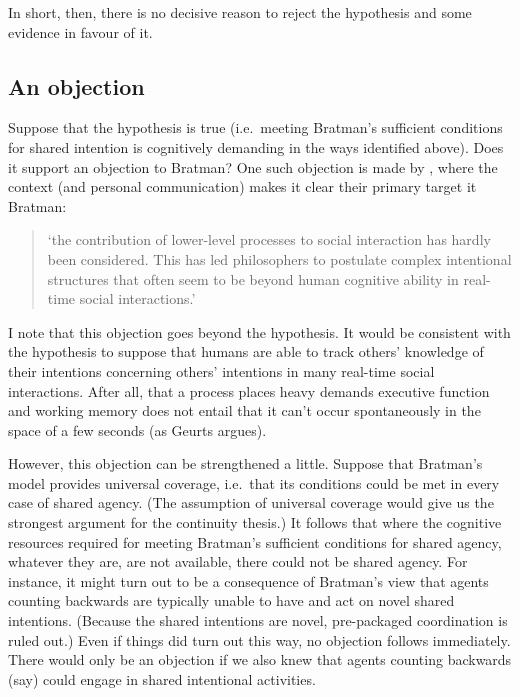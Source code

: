 \documentclass[12pt,letterpaper]{extarticle}
\begin{document}
In short, then, there is no decisive reason to reject the hypothesis and  some evidence in favour of it.


\subsection{An objection}
Suppose that the hypothesis is true (i.e.\ meeting Bratman's sufficient conditions for shared intention is cognitively demanding in the ways identified above).
Does it support an objection to Bratman?
One such objection is made by \citet[p.\ 2022]{Knoblich:2008hy}, where the context (and personal communication) makes it clear their primary target it Bratman: 
%
\begin{quote}
`the contribution of lower-level processes to social interaction has hardly been considered. This has led philosophers to postulate complex intentional structures that often seem to be beyond human cognitive ability in real-time social interactions.'
\end{quote} 
%
I note that this objection goes beyond the hypothesis.
It would be consistent with the hypothesis to suppose that humans are able to track others' knowledge of their intentions concerning others' intentions in many real-time social interactions.
After all, that a process places heavy demands executive function and working memory does not entail that it can't occur spontaneously in the space of a few seconds (as Geurts argues).

However, this objection can be strengthened a little.
Suppose that Bratman's model provides universal coverage, i.e.\ that its conditions could be met in every case of shared agency.
(The assumption of universal coverage would give us the strongest argument for the continuity thesis.)
It follows that where the cognitive resources required for meeting Bratman's sufficient conditions for shared agency, whatever they are, are not available, there could not be shared agency.
For instance, it might turn out to be a consequence of Bratman's view that agents counting backwards are typically unable to have and act on novel shared intentions.  
(Because the shared intentions are novel, pre-packaged coordination is ruled out.)
Even if things did turn out this way, no objection follows immediately.
There would only be an objection if we also knew that agents counting backwards (say) could engage in shared intentional activities.
\end{document}
